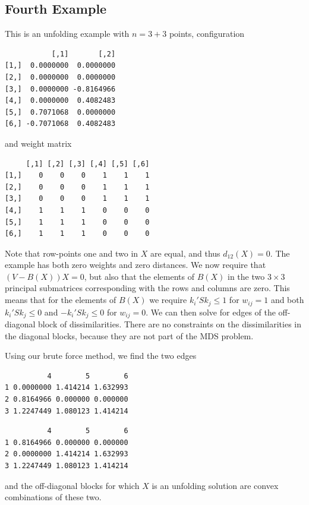 \documentclass[
  12pt,
  letterpaper,
  DIV=11,
  numbers=noendperiod]{scrreprt}
\theoremstyle{remark}
\begin{document}
\subsection{Fourth Example}\label{fourth-example}

This is an unfolding example with \(n=3+3\) points, configuration

\begin{verbatim}
           [,1]       [,2]
[1,]  0.0000000  0.0000000
[2,]  0.0000000  0.0000000
[3,]  0.0000000 -0.8164966
[4,]  0.0000000  0.4082483
[5,]  0.7071068  0.0000000
[6,] -0.7071068  0.4082483
\end{verbatim}

and weight matrix

\begin{verbatim}
     [,1] [,2] [,3] [,4] [,5] [,6]
[1,]    0    0    0    1    1    1
[2,]    0    0    0    1    1    1
[3,]    0    0    0    1    1    1
[4,]    1    1    1    0    0    0
[5,]    1    1    1    0    0    0
[6,]    1    1    1    0    0    0
\end{verbatim}

Note that row-points one and two in \(X\) are equal, and thus
\(d_{12}(X)=0\). The example has both zero weights and zero distances.
We now require that \((V-B(X))X=0\), but also that the elements of
\(B(X)\) in the two \(3\times 3\) principal submatrices corresponding
with the rows and columns are zero. This means that for the elements of
\(B(X)\) we require \(k_i'Sk_j\leq 1\) for \(w_{ij}=1\) and both
\(k_i'Sk_j\leq 0\) and \(-k_i'Sk_j\leq 0\) for \(w_{ij}=0\). We can then
solve for edges of the off-diagonal block of dissimilarities. There are
no constraints on the dissimilarities in the diagonal blocks, because
they are not part of the MDS problem.

Using our brute force method, we find the two edges

\begin{verbatim}
          4        5        6
1 0.0000000 1.414214 1.632993
2 0.8164966 0.000000 0.000000
3 1.2247449 1.080123 1.414214
\end{verbatim}

\begin{verbatim}
          4        5        6
1 0.8164966 0.000000 0.000000
2 0.0000000 1.414214 1.632993
3 1.2247449 1.080123 1.414214
\end{verbatim}

and the off-diagonal blocks for which \(X\) is an unfolding solution are
convex combinations of these two.
\end{document}
